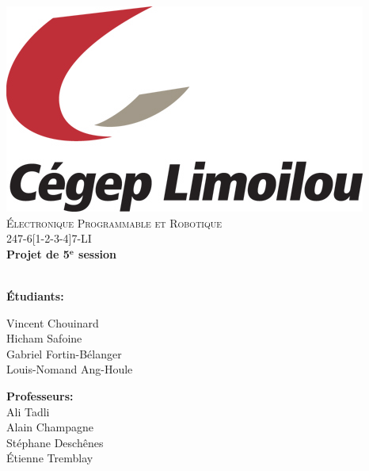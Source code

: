 \documentclass[10pt,a4paper,final]{article}
\begin{document}
\renewcommand\headrulewidth{0pt}
\fancyfoot[C]{ }






\begin{center}
\includegraphics[scale=1]{Figures/School_Logo.jpg}~\\[1cm]  
\textsc{\LARGE \'{E}lectronique Programmable et Robotique}\\[1.5cm]
\Large 247-6[1-2-3-4]7-LI\\[0.5cm]
{ \huge \bfseries Projet de 5$\mathbf{^{e}}$ session \\[0.4cm] }
\HRule \\[1.5cm]





\begin{multicols}{2}
\begin{flushleft}



\textbf{Étudiants:}\\

\bigskip

Vincent Chouinard\\
Hicham Safoine\\
Gabriel Fortin-Bélanger\\ 
Louis-Nomand Ang-Houle\\




\end{flushleft}
\vfill
\begin{flushright}

\textbf{Professeurs:}\\
\medskip
Ali Tadli\\
Alain Champagne\\
Stéphane Deschênes\\
Étienne Tremblay\\




\end{flushright}
\end{multicols}
\end{center}
\end{document}
